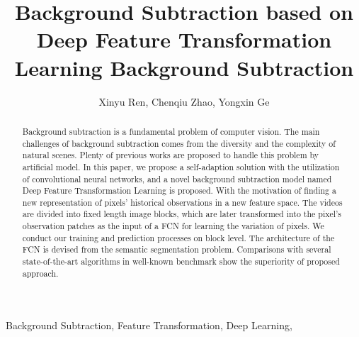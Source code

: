 \documentclass[journal]{IEEEtran}
\begin{document}
\title{Background Subtraction based on Deep Feature Transformation Learning Background Subtraction}

\author{Xinyu Ren,
        Chenqiu Zhao,
		Yongxin Ge }


\maketitle


\begin{abstract}
Background subtraction is a fundamental problem of computer vision.
The main challenges of background subtraction comes from the diversity and the complexity of natural scenes.
Plenty of previous works are proposed to handle this problem by artificial model.
In this paper,
we propose a self-adaption solution with the utilization of convolutional neural networks, 
and a novel background subtraction model named Deep Feature Transformation Learning is proposed.
With the motivation of finding a new representation of pixels’ historical observations in a new feature space.
The videos are divided into fixed length image blocks, which are later transformed into the pixel’s observation patches as the input of a FCN for learning the variation of pixels.
We conduct our training and prediction processes on block level.
The architecture of the FCN is devised from the semantic segmentation problem.
Comparisons with several state-of-the-art algorithms in well-known benchmark show the superiority of proposed approach.
\end{abstract}

\begin{IEEEkeywords} 
    Background Subtraction, Feature Transformation, Deep Learning,
\end{IEEEkeywords}

\IEEEpeerreviewmaketitle
\end{document}
